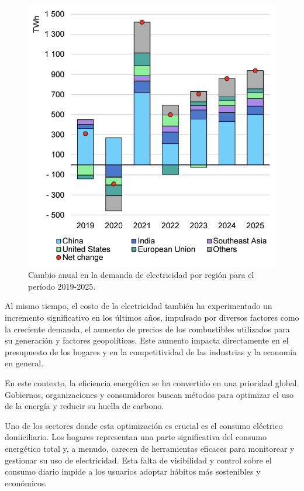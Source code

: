 \begin{figure}[ht]
	\centering
	\includegraphics[width=.7\textwidth]{./Figures/year-on-year-change-in-electricity-demand-by-region-2019-2025.png}
	\caption[Cambio anual en la demanda de electricidad por región para el período 2019-2025.]{Cambio anual en la demanda de electricidad por región para el período 2019-2025\footnotemark.}
	\label{fig:demandaElectricidad}
\end{figure}


Al mismo tiempo, el costo de la electricidad también ha experimentado un incremento significativo en los últimos años, impulsado por diversos factores como la creciente demanda, el aumento de precios de los combustibles utilizados para su generación y factores geopolíticos. Este aumento impacta directamente en el presupuesto de los hogares y en la competitividad de las industrias y la economía en general.

En este contexto, la eficiencia energética se ha convertido en una prioridad global. Gobiernos, organizaciones y consumidores buscan métodos para optimizar el uso de la energía y reducir su huella de carbono. 

Uno de los sectores donde esta optimización es crucial es el consumo eléctrico domiciliario. Los hogares representan una parte significativa del consumo energético total y, a menudo, carecen de herramientas eficaces para monitorear y gestionar su uso de electricidad. Esta falta de visibilidad y control sobre el consumo diario impide a los usuarios adoptar hábitos más sostenibles y económicos.

